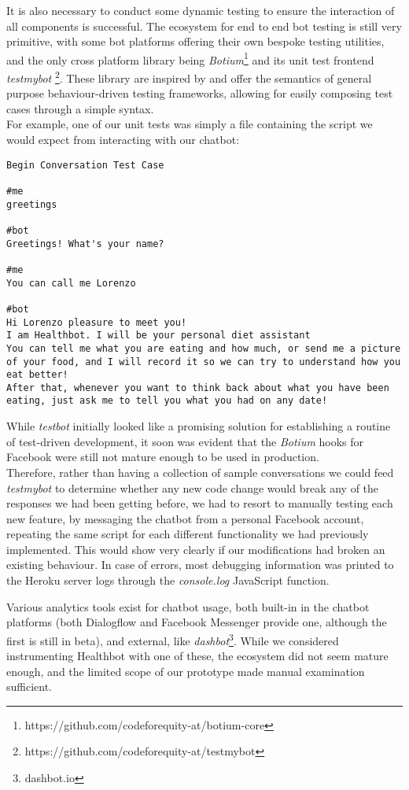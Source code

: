 It is also necessary to conduct some dynamic testing to ensure the interaction of all components is successful. The ecosystem for end to end bot testing is still very primitive, with some bot platforms offering their own bespoke testing utilities, and the only cross platform library being \textit{Botium}\footnote{https://github.com/codeforequity-at/botium-core} and its unit test frontend \textit{testmybot} \footnote{https://github.com/codeforequity-at/testmybot}. These library are inspired by and offer the semantics of general purpose behaviour-driven testing frameworks, allowing for easily composing test cases through a simple syntax. \\
For example, one of our unit tests was simply a file containing the script we would expect from interacting with our chatbot:
\begin{lstlisting}
Begin Conversation Test Case

#me
greetings

#bot
Greetings! What's your name?

#me
You can call me Lorenzo

#bot
Hi Lorenzo pleasure to meet you!
I am Healthbot. I will be your personal diet assistant
You can tell me what you are eating and how much, or send me a picture of your food, and I will record it so we can try to understand how you eat better!
After that, whenever you want to think back about what you have been eating, just ask me to tell you what you had on any date!
\end{lstlisting}
While \textit{testbot} initially looked like a promising solution for establishing a routine of test-driven development, it soon was evident that the \textit{Botium} hooks for Facebook were still not mature enough to be used in production. \\
Therefore, rather than having a collection of sample conversations we could feed \textit{testmybot} to determine whether any new code change would break any of the responses we had been getting before, we had to resort to manually testing each new feature, by messaging the chatbot from a personal Facebook account, repeating the same script for each different functionality we had previously implemented. This would show very clearly if our modifications had broken an existing behaviour. In case of errors, most debugging information was printed to the Heroku server logs through the \textit{console.log} JavaScript function.

Various analytics tools exist for chatbot usage, both built-in in the chatbot platforms (both Dialogflow and Facebook Messenger provide one, although the first is still in beta), and external, like \textit{dashbot}\footnote{dashbot.io}. While we considered instrumenting Healthbot with one of these, the ecosystem did not seem mature enough, and the limited scope of our prototype made manual examination sufficient.

